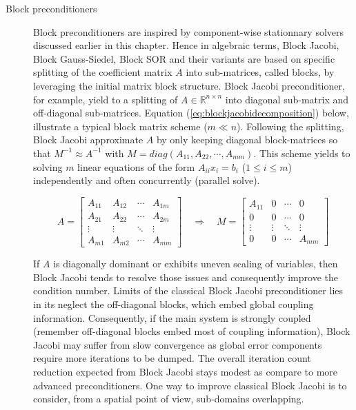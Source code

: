 \begin{description}

\item[Block preconditioners] Block preconditioners are inspired by component-wise stationnary solvers discussed earlier in this chapter. Hence in algebraic terms, Block Jacobi, Block Gauss-Siedel, Block SOR and their variants are based on specific splitting of the coefficient matrix $A$ into sub-matrices, called blocks, by leveraging the initial matrix block structure. Block Jacobi preconditioner, for example, yield to a splitting of $A \in \mathbb{R}^{n \times n}$ into diagonal sub-matrix and off-diagonal sub-matrices. Equation (\ref{eq:blockjacobidecomposition}) below, illustrate a typical block matrix scheme ($m \ll n$). Following the splitting, Block Jacobi approximate $A$ by only keeping diagonal block-matrices so that $M^{-1} \approx A^{-1}$ with $M = diag(A_{11},A_{22},\cdots,A_{mm})$. This scheme yields to solving $m$ linear equations of the form $A_{ii}x_{i}=b_{i}$  ($1 \leq i \leq m$) independently and often concurrently (parallel solve). 


\begin{equation}
A =
\begin{bmatrix}
A_{11} & A_{12} & \cdots & A_{1m} \\
A_{21} & A_{22} & \cdots & A_{2m} \\
\vdots & \vdots & \ddots & \vdots \\
A_{m1} & A_{m2} & \cdots & A_{mm} 
\end{bmatrix}
\quad \Rightarrow \quad
M =
\begin{bmatrix}
A_{11} & 0 & \cdots & 0 \\
0 & 0 & \cdots & 0 \\
\vdots & \vdots & \ddots & \vdots \\
0 & 0 & \cdots & A_{mm} 
\end{bmatrix}
\label{eq:blockjacobidecomposition}
\end{equation}

If $A$ is diagonally dominant or exhibits uneven scaling of variables, then Block Jacobi tends to resolve those issues and consequently improve the condition number. Limits of the classical Block Jacobi preconditioner lies in its neglect the off-diagonal blocks, which embed global coupling information. Consequently, if the main system is strongly coupled (remember off-diagonal blocks embed most of coupling information), Block Jacobi may suffer from slow convergence as global error components require more iterations to be dumped. The overall iteration count reduction expected from Block Jacobi stays modest as compare to more advanced preconditioners. One way to improve classical Block Jacobi is to consider, from a spatial point of view, sub-domains overlapping. 



\end{description}
